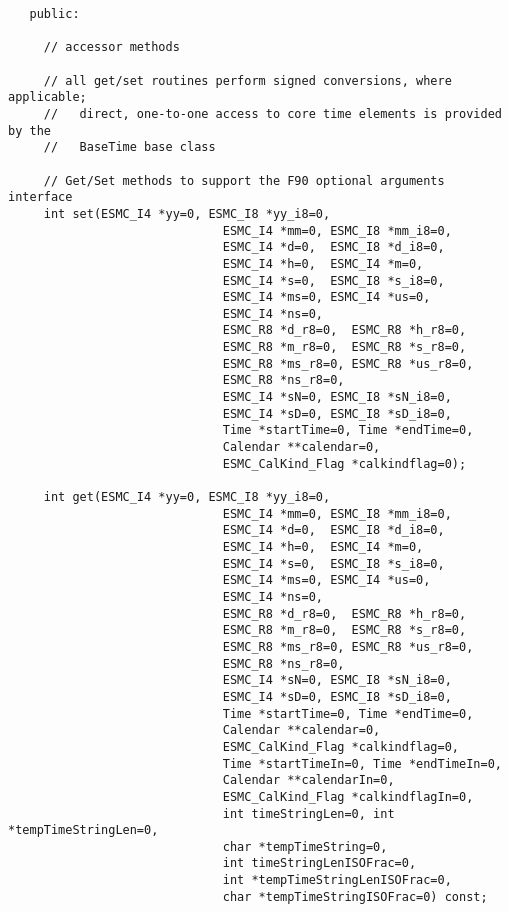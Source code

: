 \begin{verbatim} 
   public:
 
     // accessor methods
 
     // all get/set routines perform signed conversions, where applicable;
     //   direct, one-to-one access to core time elements is provided by the
     //   BaseTime base class
 
     // Get/Set methods to support the F90 optional arguments interface
     int set(ESMC_I4 *yy=0, ESMC_I8 *yy_i8=0,
                              ESMC_I4 *mm=0, ESMC_I8 *mm_i8=0,
                              ESMC_I4 *d=0,  ESMC_I8 *d_i8=0,
                              ESMC_I4 *h=0,  ESMC_I4 *m=0,
                              ESMC_I4 *s=0,  ESMC_I8 *s_i8=0,
                              ESMC_I4 *ms=0, ESMC_I4 *us=0,
                              ESMC_I4 *ns=0,
                              ESMC_R8 *d_r8=0,  ESMC_R8 *h_r8=0,
                              ESMC_R8 *m_r8=0,  ESMC_R8 *s_r8=0,
                              ESMC_R8 *ms_r8=0, ESMC_R8 *us_r8=0,
                              ESMC_R8 *ns_r8=0,
                              ESMC_I4 *sN=0, ESMC_I8 *sN_i8=0,
                              ESMC_I4 *sD=0, ESMC_I8 *sD_i8=0,
                              Time *startTime=0, Time *endTime=0,
                              Calendar **calendar=0,
                              ESMC_CalKind_Flag *calkindflag=0);
 
     int get(ESMC_I4 *yy=0, ESMC_I8 *yy_i8=0,
                              ESMC_I4 *mm=0, ESMC_I8 *mm_i8=0,
                              ESMC_I4 *d=0,  ESMC_I8 *d_i8=0,
                              ESMC_I4 *h=0,  ESMC_I4 *m=0,
                              ESMC_I4 *s=0,  ESMC_I8 *s_i8=0,
                              ESMC_I4 *ms=0, ESMC_I4 *us=0,
                              ESMC_I4 *ns=0,
                              ESMC_R8 *d_r8=0,  ESMC_R8 *h_r8=0,
                              ESMC_R8 *m_r8=0,  ESMC_R8 *s_r8=0,
                              ESMC_R8 *ms_r8=0, ESMC_R8 *us_r8=0,
                              ESMC_R8 *ns_r8=0,
                              ESMC_I4 *sN=0, ESMC_I8 *sN_i8=0,
                              ESMC_I4 *sD=0, ESMC_I8 *sD_i8=0,
                              Time *startTime=0, Time *endTime=0,
                              Calendar **calendar=0,
                              ESMC_CalKind_Flag *calkindflag=0,
                              Time *startTimeIn=0, Time *endTimeIn=0,
                              Calendar **calendarIn=0,
                              ESMC_CalKind_Flag *calkindflagIn=0,
                              int timeStringLen=0, int *tempTimeStringLen=0,
                              char *tempTimeString=0,
                              int timeStringLenISOFrac=0,
                              int *tempTimeStringLenISOFrac=0,
                              char *tempTimeStringISOFrac=0) const;
 

\end{verbatim}
